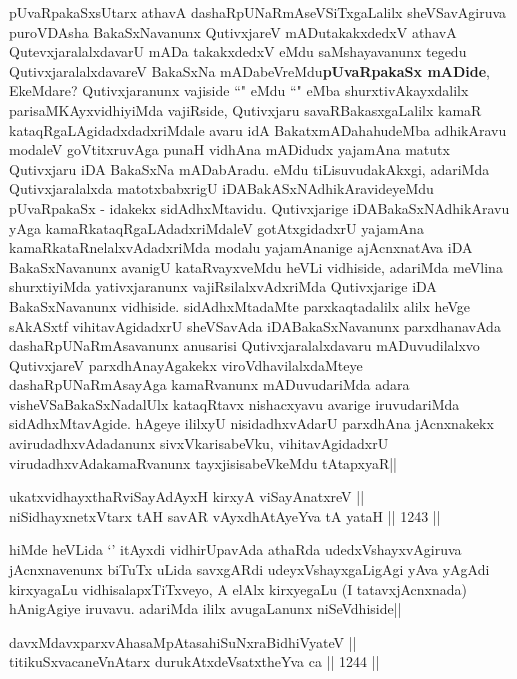 \begin{artha}
pUvaRpakaSxsUtarx athavA dashaRpUNaRmAseVSiTxgaLalilx sheVSavAgiruva puroVDAsha BakaSxNavanunx QutivxjareV mADutakakxdedxV athavA QutevxjaralalxdavarU mADa takakxdedxV eMdu saMshayavanunx tegedu QutivxjaralalxdavareV BakaSxNa mADabeVreMdu\textbf{pUvaRpakaSx mADide}, EkeMdare? Qutivxjaranunx vajiside ``\stext" eMdu ``\stext" eMba shurxtivAkayxdalilx parisaMKAyxvidhiyiMda vajiRside, Qutivxjaru savaRBakasxgaLalilx kamaR kataqRgaLAgidadxdadxriMdale avaru idA BakatxmADahahudeMba adhikAravu modaleV goVtitxruvAga punaH vidhAna mADidudx yajamAna matutx Qutivxjaru iDA BakaSxNa mADabAradu.
eMdu tiLisuvudakAkxgi, adariMda Qutivxjaralalxda matotxbabxrigU iDABakASxNAdhikAravideyeMdu pUvaRpakaSx - idakekx sidAdhxMtavidu. Qutivxjarige iDABakaSxNAdhikAravu yAga kamaRkataqRgaLAdadxriMdaleV gotAtxgidadxrU yajamAna kamaRkataRnelalxvAdadxriMda modalu yajamAnanige ajAcnxnatAva iDA BakaSxNavanunx avanigU kataRvayxveMdu heVLi vidhiside, adariMda meVlina shurxtiyiMda yativxjaranunx vajiRsilalxvAdxriMda Qutivxjarige iDA BakaSxNavanunx vidhiside. sidAdhxMtadaMte parxkaqtadalilx alilx heVge sAkASxtf vihitavAgidadxrU sheVSavAda iDABakaSxNavanunx parxdhanavAda dashaRpUNaRmAsavanunx anusarisi Qutivxjaralalxdavaru mADuvudilalxvo QutivxjareV parxdhAnayAgakekx viroVdhavilalxdaMteye dashaRpUNaRmAsayAga kamaRvanunx mADuvudariMda adara visheVSaBakaSxNadalUlx kataqRtavx nishacxyavu avarige iruvudariMda sidAdhxMtavAgide. hAgeye ililxyU nisidadhxvAdarU parxdhAna jAcnxnakekx avirudadhxvAdadanunx sivxVkarisabeVku, vihitavAgidadxrU virudadhxvAdakamaRvanunx tayxjisisabeVkeMdu tAtapxyaR||
\end{artha}

\begin{shl}
ukatxvidhayxthaRviSayAdAyxH kirxyA viSayAnatxreV || \\
niSidhayxnetxV\s tarx tAH savAR vAyxdhAtAyeYva tA yataH ||  1243 ||  
\end{shl}

\begin{artha}
hiMde heVLida `\stext'  itAyxdi vidhirUpavAda athaRda udedxVshayxvAgiruva jAcnxnavenunx biTuTx uLida savxgARdi udeyxVshayxgaLigAgi yAva yAgAdi kirxyagaLu vidhisalapxTiTxveyo, A elAlx kirxyegaLu (I tatavxjAcnxnada) hAnigAgiye iruvavu. adariMda ililx avugaLanunx niSeVdhiside||
\end{artha}


\begin{shl}
davxMdavxparxvAhasaMpAtasahiSuNxraBidhiVyateV || \\
titikuSxvacaneVnAtarx durukAtxdeVsatxtheYva ca ||  1244 ||  
\end{shl}

